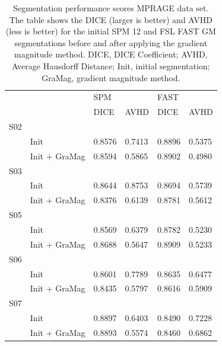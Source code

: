 \begin{table}[!ht]
\centering
\caption{
Segmentation performance scores MPRAGE data set. The table shows the DICE (larger is better) and AVHD (less is better) for the initial SPM 12 and FSL FAST GM segmentations before and after applying the gradient magnitude method. DICE, DICE Coefficient; AVHD, Average Hausdorff Distance; Init, initial segmentation; GraMag, gradient magnitude method.}
\begin{tabular}{llllll}
\\
\hline
     &                & \vline SPM   &      & \vline FAST   &      \\
     &                & \vline DICE  & AVHD & \vline DICE       & AVHD \\
\midrule
 S02 &                &            &            &             &             \\
     & Init           & 0.8576     & 0.7413     & 0.8896      & 0.5375      \\
     & Init + GraMag  & 0.8594     & 0.5865     & 0.8902      & 0.4980      \\
 S03 &                &            &            &             &             \\
     & Init           & 0.8644     & 0.8753     & 0.8694      & 0.5739      \\
     & Init + GraMag  & 0.8376     & 0.6139     & 0.8781      & 0.5612      \\
 S05 &                &            &            &             &             \\
     & Init           & 0.8569     & 0.6379     & 0.8782      & 0.5230      \\
     & Init + GraMag  & 0.8688     & 0.5647     & 0.8909      & 0.5233      \\
 S06 &                &            &            &             &             \\
     & Init           & 0.8601     & 0.7789     & 0.8635      & 0.6477      \\
     & Init + GraMag  & 0.8435     & 0.5797     & 0.8616      & 0.5909      \\
 S07 &                &            &            &             &             \\
     & Init           & 0.8897     & 0.6403     & 0.8490      & 0.7228      \\
     & Init + GraMag  & 0.8893     & 0.5574     & 0.8460      & 0.6862      \\
\bottomrule
\end{tabular}
\label{tab:table1}
\end{table}

